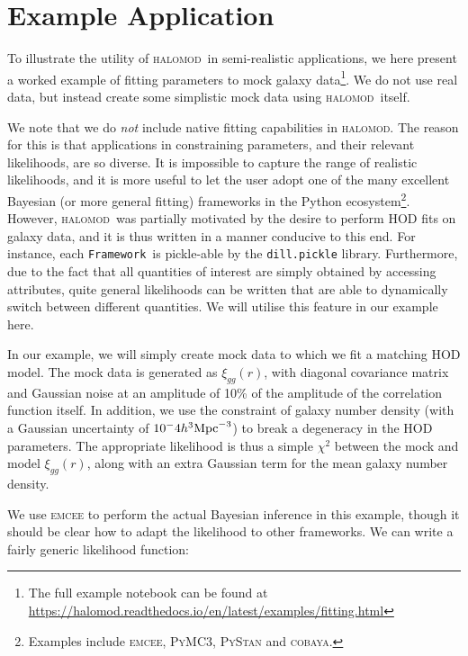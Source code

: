 \documentclass[5p,aas_macros]{elsarticle}
\newcommand{\halomod}{\textsc{halomod}}
\newcommand{\framework}{\texttt{Framework}}
\begin{document}
\section{Example Application}
\label{sec:applications}

To illustrate the utility of \halomod\ in semi-realistic applications, we here present a worked example of fitting parameters to mock galaxy data\footnote{The full example notebook can be found at \url{https://halomod.readthedocs.io/en/latest/examples/fitting.html}}. 
We do not use real data, but instead create some simplistic mock data using \halomod\ itself.

We note that we do \textit{not} include native fitting capabilities in \halomod. The reason for this is that applications in constraining parameters, and their relevant likelihoods, are so diverse. It is impossible to capture the range of realistic likelihoods, and it is more useful to let the user adopt one of the many excellent Bayesian (or more general fitting) frameworks in the Python ecosystem\footnote{Examples include \textsc{emcee}, \textsc{PyMC3}, \textsc{PyStan} and \textsc{cobaya}.}.
However, \halomod\ was partially motivated by the desire to perform HOD fits on galaxy data, and it is thus written in a manner conducive to this end.
For instance, each \framework\ is pickle-able by the \verb|dill.pickle| library. 
Furthermore, due to the fact that all quantities of interest are simply obtained by accessing attributes, quite general likelihoods can be written that are able to dynamically switch between different quantities. We will utilise this feature in our example here.

In our example, we will simply create mock data to which we fit a matching HOD model. 
The mock data is generated as $\xi_{gg}(r)$, with diagonal covariance matrix and Gaussian noise at an amplitude of 10\% of the amplitude of the correlation function itself. In addition, we use the constraint of galaxy number density (with a Gaussian uncertainty of $10^-4 h^3{\rm Mpc}^{-3}$) to break a degeneracy in the HOD parameters.
The appropriate likelihood is thus a simple $\chi^2$ between the mock and model $\xi_{gg}(r)$, along with an extra Gaussian term for the mean galaxy number density.

We use \textsc{emcee} to perform the actual Bayesian inference in this example, though it should be clear how to adapt the likelihood to other frameworks. We can write a fairly generic likelihood function:
\end{document}

